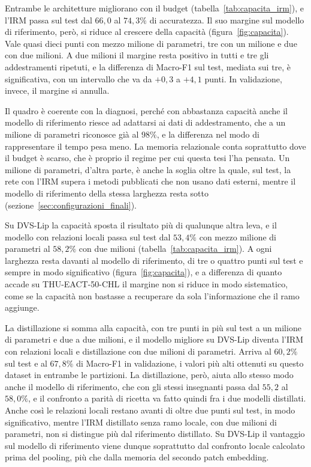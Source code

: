 Entrambe le architetture migliorano con il budget (tabella~\ref{tab:capacita_irm}), e l'IRM passa sul test dal $66{,}0$ al $74{,}3\%$ di accuratezza. Il suo margine sul modello di riferimento, però, si riduce al crescere della capacità (figura~\ref{fig:capacita}). Vale quasi dieci punti con mezzo milione di parametri, tre con un milione e due con due milioni. A due milioni il margine resta positivo in tutti e tre gli addestramenti ripetuti, e la differenza di Macro-F1 sul test, mediata sui tre, è significativa, con un intervallo che va da $+0{,}3$ a $+4{,}1$ punti. In validazione, invece, il margine si annulla.

Il quadro è coerente con la diagnosi, perché con abbastanza capacità anche il modello di riferimento riesce ad adattarsi ai dati di addestramento, che a un milione di parametri riconosce già al $98\%$, e la differenza nel modo di rappresentare il tempo pesa meno. La memoria relazionale conta soprattutto dove il budget è scarso, che è proprio il regime per cui questa tesi l'ha pensata. Un milione di parametri, d'altra parte, è anche la soglia oltre la quale, sul test, la rete con l'IRM supera i metodi pubblicati che non usano dati esterni, mentre il modello di riferimento della stessa larghezza resta sotto (sezione~\ref{sec:configurazioni_finali}).

Su DVS-Lip la capacità sposta il risultato più di qualunque altra leva, e il modello con relazioni locali passa sul test dal $53{,}4\%$ con mezzo milione di parametri al $58{,}2\%$ con due milioni (tabella~\ref{tab:capacita_irm}). A ogni larghezza resta davanti al modello di riferimento, di tre o quattro punti sul test e sempre in modo significativo (figura~\ref{fig:capacita}), e a differenza di quanto accade su THU-EACT-50-CHL il margine non si riduce in modo sistematico, come se la capacità non bastasse a recuperare da sola l'informazione che il ramo aggiunge.

La distillazione si somma alla capacità, con tre punti in più sul test a un milione di parametri e due a due milioni, e il modello migliore su DVS-Lip diventa l'IRM con relazioni locali e distillazione con due milioni di parametri. Arriva al $60{,}2\%$ sul test e al $67{,}8\%$ di Macro-F1 in validazione, i valori più alti ottenuti su questo dataset in entrambe le partizioni. La distillazione, però, aiuta allo stesso modo anche il modello di riferimento, che con gli stessi insegnanti passa dal $55{,}2$ al $58{,}0\%$, e il confronto a parità di ricetta va fatto quindi fra i due modelli distillati. Anche così le relazioni locali restano avanti di oltre due punti sul test, in modo significativo, mentre l'IRM distillato senza ramo locale, con due milioni di parametri, non si distingue più dal riferimento distillato. Su DVS-Lip il vantaggio sul modello di riferimento viene dunque soprattutto dal confronto locale calcolato prima del pooling, più che dalla memoria del secondo patch embedding.


